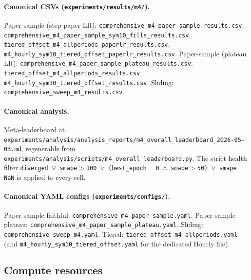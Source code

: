 \documentclass{article}
\begin{document}
\begin{sloppypar}
\paragraph{Canonical CSVs (\nolinkurl{experiments/results/m4/}).} Paper-sample (step-paper LR): \nolinkurl{comprehensive_m4_paper_sample_results.csv}, \nolinkurl{comprehensive_m4_paper_sample_sym10_fills_results.csv}, \nolinkurl{tiered_offset_m4_allperiods_paperlr_results.csv}, \nolinkurl{m4_hourly_sym10_tiered_offset_paperlr_results.csv}. Paper-sample (plateau LR): \nolinkurl{comprehensive_m4_paper_sample_plateau_results.csv}, \nolinkurl{tiered_offset_m4_allperiods_results.csv}, \nolinkurl{m4_hourly_sym10_tiered_offset_results.csv}. Sliding: \nolinkurl{comprehensive_sweep_m4_results.csv}.

\paragraph{Canonical analysis.} Meta-leaderboard at \nolinkurl{experiments/analysis/analysis_reports/m4_overall_leaderboard_2026-05-03.md}, regenerable from \nolinkurl{experiments/analysis/scripts/m4_overall_leaderboard.py}. The strict health filter \texttt{diverged $\lor$ smape$>$100 $\lor$ (best\_epoch$=$0 $\land$ smape$>$50) $\lor$ smape NaN} is applied to every cell.

\paragraph{Canonical YAML configs (\nolinkurl{experiments/configs/}).} Paper-sample faithful: \nolinkurl{comprehensive_m4_paper_sample.yaml}. Paper-sample plateau: \nolinkurl{comprehensive_m4_paper_sample_plateau.yaml}. Sliding: \nolinkurl{comprehensive_sweep_m4.yaml}. Tiered: \nolinkurl{tiered_offset_m4_allperiods.yaml} (and \nolinkurl{m4_hourly_sym10_tiered_offset.yaml} for the dedicated Hourly file).
\end{sloppypar}

\subsection{Compute resources}
\label{app:hyperparams:compute}
\end{document}
